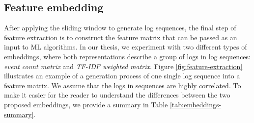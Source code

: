 \subsection{Feature embedding}
\label{subsection:features}
After applying the sliding window to generate log sequences, the final step of feature extraction is to construct the feature matrix that can be passed as an input to ML algorithms. In our thesis, we experiment with two different types of embeddings, where both representations describe a group of logs in log sequences: \textit{event count matrix} and \textit{TF-IDF weighted matrix}. Figure \ref{fig:feature-extraction} illustrates an example of a generation process of one single log sequence into a feature matrix. We assume that the logs in sequences are highly correlated. To make it easier for the reader to understand the differences between the two proposed embeddings, we provide a summary in Table \ref{tab:embeddings-summary}.

\begin{figure}[!h] 
\end{figure}

\begin{table}
\centering
{}
\caption{A summary of feature matrix types using in our thesis }\label{tab:embeddings-summary}
\end{table}

